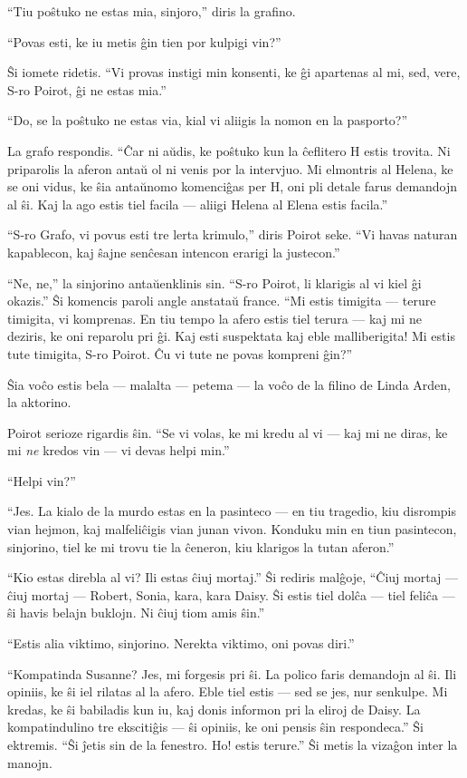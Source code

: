 ``Tiu poŝtuko ne estas mia, sinjoro,'' diris la grafino.

``Povas esti, ke iu metis ĝin tien por kulpigi vin?''

Ŝi iomete ridetis. ``Vi provas instigi min konsenti, ke ĝi apartenas al mi, sed, vere, S-ro Poirot, ĝi ne estas mia.''

``Do, se la poŝtuko ne estas via, kial vi aliigis la nomon en la pasporto?''

La grafo respondis. ``Ĉar ni aŭdis, ke poŝtuko kun la ĉeflitero H estis trovita. Ni priparolis la aferon antaŭ ol ni venis por la intervjuo. Mi elmontris al Helena, ke se oni vidus, ke ŝia antaŭnomo komenciĝas per H, oni pli detale farus demandojn al ŝi. Kaj la ago estis tiel facila --- aliigi Helena al Elena estis facila.''

``S-ro Grafo, vi povus esti tre lerta krimulo,'' diris Poirot seke. ``Vi havas naturan kapablecon, kaj ŝajne senĉesan intencon erarigi la justecon.''

``Ne, ne,'' la sinjorino antaŭenklinis sin. ``S-ro Poirot, li klarigis al vi kiel ĝi okazis.'' Ŝi komencis paroli angle anstataŭ france. ``Mi estis timigita --- terure timigita, vi komprenas. En tiu tempo la afero estis tiel terura --- kaj mi ne deziris, ke oni reparolu pri ĝi. Kaj esti suspektata kaj eble malliberigita! Mi estis tute timigita, S-ro Poirot. Ĉu vi tute ne povas kompreni ĝin?''

Ŝia voĉo estis bela --- malalta --- petema --- la voĉo de la filino de Linda Arden, la aktorino.

Poirot serioze rigardis ŝin. ``Se vi volas, ke mi kredu al vi --- kaj mi ne diras, ke mi \emph{ne} kredos vin --- vi devas helpi min.''

``Helpi vin?''

``Jes. La kialo de la murdo estas en la pasinteco --- en tiu tragedio, kiu disrompis vian hejmon, kaj malfeliĉigis vian junan vivon. Konduku min en tiun pasintecon, sinjorino, tiel ke mi trovu tie la ĉeneron, kiu klarigos la tutan aferon.''

``Kio estas direbla al vi? Ili estas ĉiuj mortaj.'' Ŝi rediris malĝoje, ``Ĉiuj mortaj --- ĉiuj mortaj --- Robert, Sonia, kara, kara Daisy. Ŝi estis tiel dolĉa --- tiel feliĉa --- ŝi havis belajn buklojn. Ni ĉiuj tiom amis ŝin.''

``Estis alia viktimo, sinjorino. Nerekta viktimo, oni povas diri.''

``Kompatinda Susanne? Jes, mi forgesis pri ŝi. La polico faris demandojn al ŝi. Ili opiniis, ke ŝi iel rilatas al la afero. Eble tiel estis --- sed se jes, nur senkulpe. Mi kredas, ke ŝi babiladis kun iu, kaj donis informon pri la eliroj de Daisy. La kompatindulino tre ekscitiĝis --- ŝi opiniis, ke oni pensis ŝin respondeca.'' Ŝi ektremis. ``Ŝi ĵetis sin de la fenestro. Ho! estis terure.'' Ŝi metis la vizaĝon inter la manojn.

